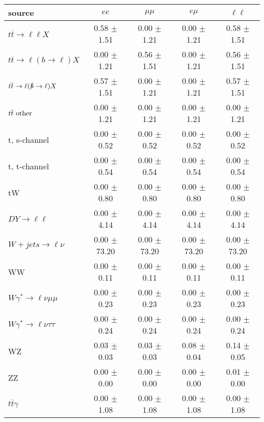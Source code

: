\begin{tabular}{l|cccc} \hline\hline
source & $ee$ & $\mu\mu$ & $e\mu$ & $\ell\ell $ \\
\hline
$t\overline{t} \rightarrow \ell \ell X$ &  0.58 $\pm$  1.51 &  0.00 $\pm$  1.21 &  0.00 $\pm$  1.21 &  0.58 $\pm$  1.51 \\
$t\overline{t} \rightarrow \ell (b \rightarrow \ell) X$ &  0.00 $\pm$  1.21 &  0.56 $\pm$  1.51 &  0.00 $\pm$  1.21 &  0.56 $\pm$  1.51 \\
$t\overline{t} \rightarrow \ell (\slashed b \rightarrow \ell) X$ &  0.57 $\pm$  1.51 &  0.00 $\pm$  1.21 &  0.00 $\pm$  1.21 &  0.57 $\pm$  1.51 \\
        $t\overline{t}\ \rm{other}$ &  0.00 $\pm$  1.21 &  0.00 $\pm$  1.21 &  0.00 $\pm$  1.21 &  0.00 $\pm$  1.21 \\
\hline
                       t, s-channel &  0.00 $\pm$  0.52 &  0.00 $\pm$  0.52 &  0.00 $\pm$  0.52 &  0.00 $\pm$  0.52 \\
                       t, t-channel &  0.00 $\pm$  0.54 &  0.00 $\pm$  0.54 &  0.00 $\pm$  0.54 &  0.00 $\pm$  0.54 \\
                                 tW &  0.00 $\pm$  0.80 &  0.00 $\pm$  0.80 &  0.00 $\pm$  0.80 &  0.00 $\pm$  0.80 \\
\hline
         $DY \rightarrow \ell \ell$ &  0.00 $\pm$  4.14 &  0.00 $\pm$  4.14 &  0.00 $\pm$  4.14 &  0.00 $\pm$  4.14 \\
      $W+jets \rightarrow \ell \nu$ &  0.00 $\pm$ 73.20 &  0.00 $\pm$ 73.20 &  0.00 $\pm$ 73.20 &  0.00 $\pm$ 73.20 \\
                                 WW &  0.00 $\pm$  0.11 &  0.00 $\pm$  0.11 &  0.00 $\pm$  0.11 &  0.00 $\pm$  0.11 \\
\hline
$W\gamma^{*} \rightarrow \ell \nu \mu\mu$ &  0.00 $\pm$  0.23 &  0.00 $\pm$  0.23 &  0.00 $\pm$  0.23 &  0.00 $\pm$  0.23 \\
$W\gamma^{*} \rightarrow \ell \nu \tau\tau$ &  0.00 $\pm$  0.24 &  0.00 $\pm$  0.24 &  0.00 $\pm$  0.24 &  0.00 $\pm$  0.24 \\
                                 WZ &  0.03 $\pm$  0.03 &  0.03 $\pm$  0.03 &  0.08 $\pm$  0.04 &  0.14 $\pm$  0.05 \\
                                 ZZ &  0.00 $\pm$  0.00 &  0.00 $\pm$  0.00 &  0.00 $\pm$  0.00 &  0.01 $\pm$  0.00 \\
\hline
              $t\overline{t}\gamma$ &  0.00 $\pm$  1.08 &  0.00 $\pm$  1.08 &  0.00 $\pm$  1.08 &  0.00 $\pm$  1.08 \\

\end{tabular}
